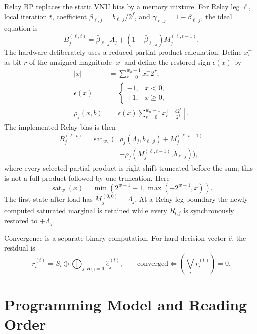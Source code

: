 \documentclass[10pt,conference]{IEEEtran}
\begin{document}
Relay BP replaces the static VNU bias by a memory mixture.  For Relay leg
$\ell$, local iteration $t$, coefficient
$\bar\beta_{\ell,j}=b_{\ell,j}/2^f$, and
$\gamma_{\ell,j}=1-\bar\beta_{\ell,j}$, the ideal equation is
\begin{equation}
 B_j^{(\ell,t)}=
 \bar\beta_{\ell,j}\Lambda_j+
 (1-\bar\beta_{\ell,j})M_j^{(\ell,t-1)}.
 \label{eq:memory}
\end{equation}
The hardware deliberately uses a reduced partial-product calculation.  Define
$x_r^+$ as bit $r$ of the unsigned magnitude $|x|$ and define the restored sign
$\epsilon(x)$ by
\begin{align}
 |x|&=\sum_{r=0}^{w_a-1}x_r^+2^r,\\
 \epsilon(x)&=\begin{cases}-1,&x<0,\\+1,&x\geq0,\end{cases}\\
 \rho_f(x,b)&=\epsilon(x)\sum_{r=0}^{w_a-1}x_r^+
 \left\lfloor\frac{b2^r}{2^f}\right\rfloor.
 \label{eq:reduced-product}
\end{align}
The implemented Relay bias is then
\begin{equation}
 \begin{split}
 B_j^{(\ell,t)}=\operatorname{sat}_{w_a}\big(&
 \rho_f(\Lambda_j,b_{\ell,j})+M_j^{(\ell,t-1)}\\
 &-\rho_f(M_j^{(\ell,t-1)},b_{\ell,j})\big),
 \end{split}
 \label{eq:relay-bias}
\end{equation}
where every selected partial product is right-shift-truncated before the sum;
this is not a full product followed by one truncation.  Here
\begin{equation}
 \operatorname{sat}_{w}(x)=
 \min\!\left(2^{w-1}-1,\max(-2^{w-1},x)\right).
 \label{eq:saturation}
\end{equation}
The first state after load has $M_j^{(0,0)}=\Lambda_j$.  At a Relay leg
boundary the newly computed saturated marginal is retained while every
$R_{i,j}$ is synchronously restored to $+\Lambda_j$.

Convergence is a separate binary computation.  For hard-decision vector
$\hat e$, the residual is
\begin{equation}
 r_i^{(t)}=S_i\oplus\bigoplus_{j:H_{i,j}=1}\hat e_j^{(t)},
 \qquad \text{converged}\iff \left(\bigvee_i r_i^{(t)}\right)=0.
 \label{eq:residual}
\end{equation}

\section{Programming Model and Reading Order}
\end{document}
